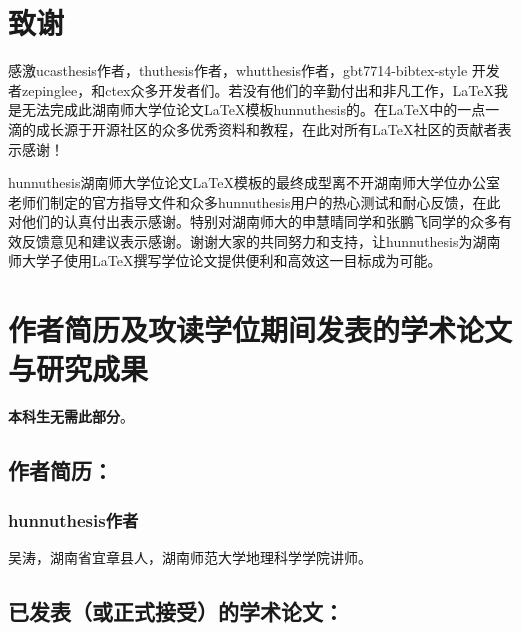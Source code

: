 \chapter[致谢]{致\quad 谢}%

感激ucasthesis作者，thuthesis作者，whutthesis作者，gbt7714-bibtex-style
开发者zepinglee，和ctex众多开发者们。若没有他们的辛勤付出和非凡工作，\LaTeX{}我是无法完成此湖南师大学位论文\LaTeX{}模板hunnuthesis的。在\LaTeX{}中的一点一滴的成长源于开源社区的众多优秀资料和教程，在此对所有\LaTeX{}社区的贡献者表示感谢！

hunnuthesis湖南师大学位论文\LaTeX{}模板的最终成型离不开湖南师大学位办公室老师们制定的官方指导文件和众多hunnuthesis用户的热心测试和耐心反馈，在此对他们的认真付出表示感谢。特别对湖南师大的申慧晴同学和张鹏飞同学的众多有效反馈意见和建议表示感谢。谢谢大家的共同努力和支持，让hunnuthesis为湖南师大学子使用\LaTeX{}撰写学位论文提供便利和高效这一目标成为可能。

\chapter{作者简历及攻读学位期间发表的学术论文与研究成果}

\textbf{本科生无需此部分}。

\section*{作者简历：}


\subsection*{hunnuthesis作者}

吴涛，湖南省宜章县人，湖南师范大学地理科学学院讲师。

\section*{已发表（或正式接受）的学术论文：}

